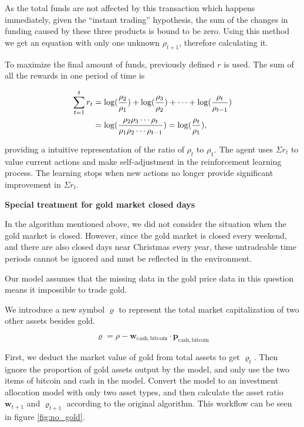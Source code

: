 \documentclass{mcmthesis}
\begin{document}
As the total funds are not affected by this transaction which happens immediately,
given the ``instant trading'' hypothesis,
the sum of the changes in funding caused by these three products is bound to be zero.
Using this method we get an equation with only one unknown $\rho _{t+1}$,
therefore calculating it.

To maximize the final amount of funds,
previously defined $r$ is used.
The sum of all the rewards in one period of time is


\begin{align}
  \sum_{t=1}^t r_t &= \log(\frac{\rho_2}{\rho_1}) + \log(\frac{\rho_3}{\rho_2}) + \cdots + \log(\frac{\rho_t}{\rho_{t-1}}) \notag \\
  &= \log(\frac{\rho_2 \rho_3 \cdots \rho_t}{\rho_1 \rho_2 \cdots \rho_{t-1}}) = \log(\frac{\rho_t}{\rho_1}),
\end{align}

providing a intuitive representation of the ratio of $\rho_t$ to $\rho_1$.
The agent uses $\Sigma r_t$ to value current actions and make self-adjustment
in the reinforcement learning process.
The learning stops when new actions no longer provide significant improvement in $\Sigma r_t$.

\noindent \textbf{Special treatment for gold market closed days} \par
In the algorithm mentioned above, we did not consider the situation when the gold market is closed. However, since the gold market is closed every weekend, and there are also closed days near Christmas every year, these untradeable time periods cannot be ignored and must be reflected in the environment.

Our model assumes that the missing data in the gold price data in this question means it impossible to trade gold.

We introduce a new symbol $\varrho$ to represent the total market capitalization of two other assets besides gold.

\[
  \varrho = \rho - \pmb{w}_{\mathrm{cash, bitcoin}} \cdot \pmb{p}_{\mathrm{cash, bitcoin}}
\]


First, we deduct the market value of gold from total assets to get $\varrho_{t}$. Then ignore the proportion of gold assets output by the model, and only use the two items of bitcoin and cash in the model. Convert the model to an investment allocation model with only two asset types, and then calculate the asset ratio $\pmb{w}_{t+1}$ and $\varrho_{t+1}$ according to the original algorithm. This workflow can be seen in figure \ref{fig:no_gold}.
\end{document}
